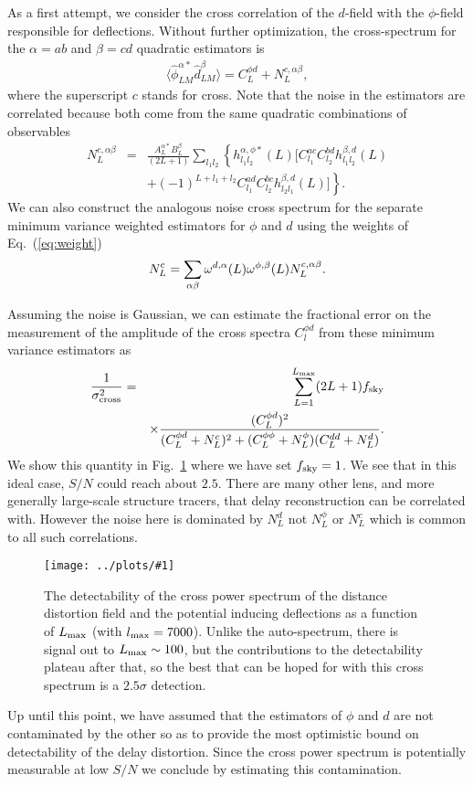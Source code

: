 \documentclass[prd,amsmath,amssymb,floatfix,superscriptaddress,nofootinbib,twocolumn]{revtex4-1}
\def\be{\begin{equation}}
\def\ee{\end{equation}}
\def\bea{\begin{eqnarray}}
\def\eea{\end{eqnarray}}
\newcommand{\ec}[1]{Eq.~(\ref{eq:#1})}
\newcommand{\eql}[1]{\label{eq:#1}}
\newcommand{\sfig}[2]{
\texttt{[image: ../plots/\#1]}
        }
\newcommand{\Sfig}[2]{
   \begin{figure}[thbp]
   \begin{center}
    \sfig{#1.pdf}{\columnwidth}
    \caption{{\small #2}}
    \label{fig:#1}
     \end{center}
   \end{figure}
}
\newcommand{\rf}[1]{\ref{fig:#1}}
\newcommand{\wh}[1]{{\color{red} #1}}
\begin{document}
As a first attempt, we consider the cross correlation of the $d$-field with the $\phi$-field responsible for deflections. Without further optimization, the cross-spectrum for the $\alpha=ab$ and
$\beta=cd$ quadratic estimators is 
\bea
 \langle \hat{\phi}^{\alpha*}_{LM}\hat{d}^{\beta}_{LM} \rangle= {C}_{L}^{\phi d} +N_{L}^{c,\alpha\beta},\eql{crossn}
\eea 
where the superscript $c$ stands for cross.  Note that the noise in the estimators are correlated because 
both come from the same quadratic combinations of observables 
\bea
N_{L}^{c,\alpha\beta}&=&\frac{A_{L}^{\alpha*}B_{L}^{\beta}}{(2L+1)}\sum_{l_{1}l_{2}}  \left\{ h_{l_{1}l_{2}}^{\alpha,\phi*} (L)\big[ C_{l_{1}}^{ac}C_{l_{2}}^{bd}h_{l_{1}l_{2}}^{\beta,d}(L)\right. \nonumber \\
&&\left. +(-1)^{L+l_{1}+l_{2}}C_{l_{1}}^{ad}C_{l_{2}}^{bc} h_{l_{2}l_{1}}^{\beta,d}(L)  \big]\right\}.
\eea
We can also construct the analogous noise cross spectrum for the separate minimum variance weighted estimators for $\phi$ and $d$  using
the weights of \ec{weight} 
\be
N^{\rm c}_L = \sum_{\alpha\beta } \omega^{d,\alpha}(L) \omega^{\phi,\beta}(L) N^{c,\alpha\beta}_L.
\ee

Assuming the noise is Gaussian, we can  estimate the fractional
error on the measurement of the amplitude of the cross spectra $C_l^{\phi d}$ from these minimum variance estimators as
\bea
\eql{sn1}
\frac{1}{\sigma_{\rm cross}^{2} }&=& \sum_{L=1}^{L_{\rm max}}(2L+1)f_{\rm sky} \\
&&\times\frac{(C_L^{\phi d})^2}{( C_L^{\phi d}+N_{L}^{ c})^2+
(C_L^{\phi\phi}+N_L^{\phi})(C_L^{dd}+N_L^{d})}. \nonumber
\eea
We show this quantity in Fig.~\rf{CrossStoN} where we have set
 $f_{\rm sky}=1$. We  see that in this ideal case, $S/N$ could reach about $2.5$.  \wh{
 There are many other lens, and more generally large-scale structure tracers, that delay 
 reconstruction can be correlated with.  However the noise here is dominated by $N_L^d$ not
 $N_L^\phi$ or $N_L^c$ which is common to all such correlations.}
  
 
 \Sfig{CrossStoN}{The detectability of the cross power spectrum of the distance distortion field and the potential inducing deflections as a function of $L_{\rm max}$ (with  $l_{\rm max}=7000$). Unlike the auto-spectrum, there is signal out to $L_{\rm max}\sim 100$, but the contributions to the detectability plateau after that, so the best that can be hoped for with this cross spectrum is a $2.5\sigma$ detection.}

 
Up until this point, we have assumed that the estimators of $\phi$ and $d$ are not 
 contaminated by the other so as to provide the most optimistic bound on detectability of the
 delay distortion.   Since the cross power spectrum is potentially measurable at low $S/N$ we
 conclude by estimating this contamination.
 
\end{document}
